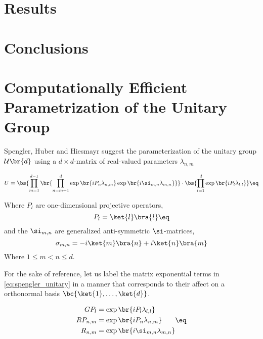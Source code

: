 \documentclass[aps, english, twoside, pra, longbibliography]{revtex4-1}
\begin{document}
    \section{Results}
    \section{Conclusions}
    \appendix
    \section{Computationally Efficient Parametrization of the Unitary Group}
    Spengler, Huber and Hiesmayr \cite{Spengler_2010_Unitary} suggest the parameterization of the unitary group $\mathcal{U}\br{d}$ using a $d\times d$-matrix of real-valued parameters $\lambda_{n, m}$

    \[ U = \bs{\prod_{m=1}^{d-1} \br{\prod_{n=m+1}^{d} \exp\br{i P_n \lambda_{n,m}}\exp\br{i \si_{m,n} \lambda_{m,n}}}} \cdot \bs{\prod_{l=1}^{d} \exp\br{iP_l \lambda_{l,l}}}  \eq \label{eq:spengler_unitary} \]

    Where $P_l$ are one-dimensional projective operators,
    \[ P_l = \ket{l}\bra{l} \eq \label{eq:projective_operator} \]
    and the $\si_{m,n}$ are generalized anti-symmetric $\si$-matrices,
    \[ \sigma_{m,n} = -i \ket{m}\bra{n} +i \ket{n}\bra{m} \]
    Where $1 \leq m < n \leq d$.

    For the sake of reference, let us label the matrix exponential terms in \eqref{eq:spengler_unitary} in a manner that corresponds to their affect on a orthonormal basis $\bc{\ket{1}, \ldots, \ket{d}}$.

    \begin{align}
    \begin{split}
        GP_l &= \exp\br{iP_l \lambda_{l,l}} \\
        RP_{n,m} &= \exp\br{i P_n \lambda_{n,m}} \\
        R_{n,m} &= \exp\br{i \si_{m,n} \lambda_{m,n}}
    \end{split} \eq \label{eq:exp_terms}
    \end{align}
\end{document}
